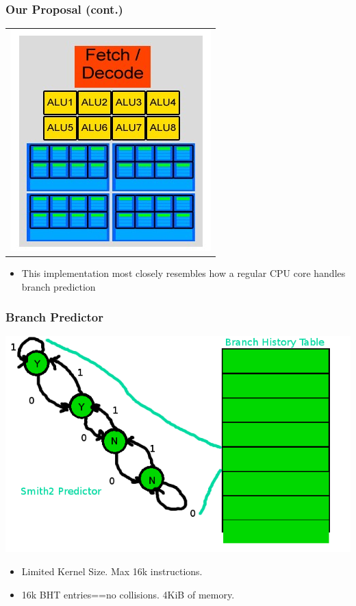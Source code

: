 \documentclass{beamer}
\begin{document}
\begin{frame}
	\frametitle{Our Proposal (cont.)}
	\begin{tabular}{c}
		\includegraphics[width=.5\textwidth]{Our-GPU---per-element-predictor.jpg}
	\end{tabular}
	\begin{itemize}
		\item This implementation most closely resembles how a regular CPU core handles branch prediction
	\end{itemize}
\end{frame}

\begin{frame}
    \frametitle{Branch Predictor}
    \includegraphics[height=.9\textheight]{bht.png}
    \begin{itemize}
     \item Limited Kernel Size.  Max 16k instructions.
     \item 16k BHT entries==no collisions.  4KiB of memory.
    \end{itemize}
\end{frame}
\end{document}
